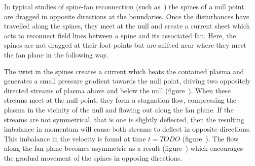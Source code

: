 In typical studies of spine-fan reconnection (such as~\cite{pontinCurrentSheetFormation2007}) the spines of a null point are dragged in opposite directions at the boundaries. Once the disturbances have travelled along the spines, they meet at the null and create a current sheet which acts to reconnect field lines between a spine and its associated fan. Here, the spines are not dragged at their foot points but are shifted near where they meet the fan plane in the following way.

The twist in the spines creates a current which heats the contained plasma and generates a small pressure gradient towards the null point, driving two oppositely directed streams of plasma above and below the null (figure~). When these streams meet at the null point, they form a stagnation flow, compressing the plasma in the vicinity of the null and flowing out along the fan plane. If the streams are not symmetrical, that is one is slightly deflected, then the resulting imbalance in momentum will cause both streams to deflect in opposite directions. This imbalance in the velocity is found at time $t=TODO$ (figure~). The flow along the fan plane becomes asymmetric as a result (figure~) which encourages the gradual movement of the spines in opposing directions.

